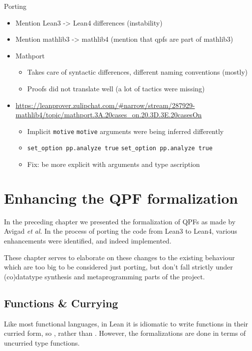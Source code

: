 \documentclass[titlepage]{report}
\newenvironment{todo}{%
\definecolor{shadecolor}{HTML}{F8E0E0}%
\begin{shaded}%
\begin{trivlist}                         
    \item[\hskip \labelsep {\bfseries Todo:}]}{\end{trivlist}\end{shaded}}
\newcommand\lean[1]{%
\ifx\leanmode\undefined%
\def\leanmode{1}%
\texttt{\small #1}%
\undef\leanmode%
\else%
\texttt{#1}%
\fi%
}
\newcommand\etal{\emph{et al.}}
\begin{document}
\begin{todo}
    Porting
    \begin{itemize}
        \item Mention Lean3 -> Lean4 differences (instability)
        \item Mention mathlib3 -> mathlib4 (mention that qpfs are part of mathlib3)
        \item Mathport 
                \begin{itemize}
                    \item Takes care of syntactic differences, different naming conventions (mostly)
                    \item Proofs did not translate well (a lot of tactics were missing)
                \end{itemize}
        \item \url{https://leanprover.zulipchat.com/#narrow/stream/287929-mathlib4/topic/mathport.3A.20cases_on.20.3D.3E.20casesOn}
            \begin{itemize}
                \item Implicit \lean{motive} arguments were being inferred differently
                \item \lean{set\_option pp.analyze true}
                \item Fix: be more explicit with arguments and type ascription
            \end{itemize}
    \end{itemize}
\end{todo}




\chapter{Enhancing the QPF formalization}
\label{ch:enhancing}


In the preceding chapter we presented the formalization of QPFs as made by Avigad \etal{}
In the process of porting the code from Lean3 to Lean4, various enhancements were identified, and indeed implemented. 

These chapter serves to elaborate on these changes to the existing behaviour which are too big to be considered just porting, but don't fall strictly under (co)datatype synthesis and metaprogramming parts of the project.






\section{Functions \& Currying}
Like most functional languages, in Lean it is idiomatic to write functions in their curried form, 
so , rather than .
However, the formalizations are done in terms of uncurried type functions.
\end{document}
